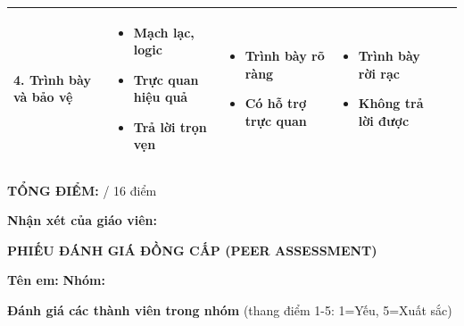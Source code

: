 \documentclass[12pt,a4paper]{article}
\begin{document}
\begin{tabularx}{\textwidth}{|>{\raggedright\arraybackslash}p{2.8cm}|>{\raggedright\arraybackslash}X|>{\raggedright\arraybackslash}X|>{\raggedright\arraybackslash}X|c|}
\textbf{4. Trình bày và bảo vệ}
& 
\begin{itemize}[leftmargin=*,noitemsep,topsep=0pt]
    \item Mạch lạc, logic
    \item Trực quan hiệu quả
    \item Trả lời trọn vẹn
\end{itemize}
& 
\begin{itemize}[leftmargin=*,noitemsep,topsep=0pt]
    \item Trình bày rõ ràng
    \item Có hỗ trợ trực quan
\end{itemize}
& 
\begin{itemize}[leftmargin=*,noitemsep,topsep=0pt]
    \item Trình bày rời rạc
    \item Không trả lời được
\end{itemize}
& \underline{\hspace{1cm}} \\
\hline
\end{tabularx}

\vspace{0.5cm}
\noindent\textbf{TỔNG ĐIỂM:} \underline{\hspace{2cm}} / 16 điểm

\vspace{0.5cm}
\noindent\textbf{Nhận xét của giáo viên:}

\underline{\hspace{\textwidth}}

\underline{\hspace{\textwidth}}

\underline{\hspace{\textwidth}}

\vspace{1cm}
\begin{center}
{\Large\bfseries\sffamily\color{primary} PHIẾU ĐÁNH GIÁ ĐỒNG CẤP (PEER ASSESSMENT)}
\end{center}

\vspace{0.3cm}
\noindent\textbf{Tên em:} \underline{\hspace{4cm}} \hfill \textbf{Nhóm:} \underline{\hspace{2cm}}

\vspace{0.5cm}
\textbf{Đánh giá các thành viên trong nhóm} (thang điểm 1-5: 1=Yếu, 5=Xuất sắc)
\end{document}
